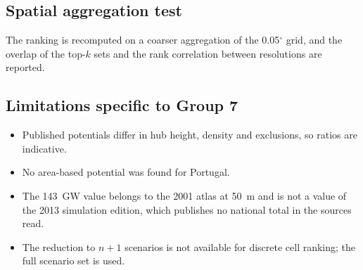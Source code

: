 \subsection{Spatial aggregation test}
The ranking is recomputed on a coarser aggregation of the 0.05$^{\circ}$ grid, and the overlap of the top-$k$ sets and the rank correlation between resolutions are reported. %

\subsection{Limitations specific to Group 7}
\begin{itemize}
\item Published potentials differ in hub height, density and exclusions, so ratios are indicative.
\item No area-based potential was found for Portugal.
\item The 143~GW value belongs to the 2001 atlas at 50~m and is not a value of the 2013 simulation edition, which publishes no national total in the sources read.
\item The reduction to $n+1$ scenarios is not available for discrete cell ranking; the full scenario set is used.
\end{itemize}
